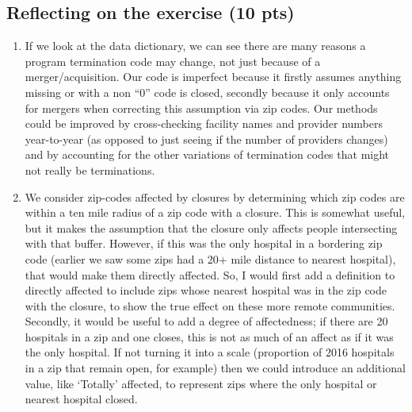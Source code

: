 \documentclass[
  letterpaper,
  DIV=11,
  numbers=noendperiod]{scrartcl}
\begin{document}
\subsection{Reflecting on the exercise (10
pts)}\label{reflecting-on-the-exercise-10-pts}

\begin{enumerate}
\def\labelenumi{\arabic{enumi}.}
\item
  If we look at the data dictionary, we can see there are many reasons a
  program termination code may change, not just because of a
  merger/acquisition. Our code is imperfect because it firstly assumes
  anything missing or with a non ``0'' code is closed, secondly because
  it only accounts for mergers when correcting this assumption via zip
  codes. Our methods could be improved by cross-checking facility names
  and provider numbers year-to-year (as opposed to just seeing if the
  number of providers changes) and by accounting for the other
  variations of termination codes that might not really be terminations.
\item
  We consider zip-codes affected by closures by determining which zip
  codes are within a ten mile radius of a zip code with a closure. This
  is somewhat useful, but it makes the assumption that the closure only
  affects people intersecting with that buffer. However, if this was the
  only hospital in a bordering zip code (earlier we saw some zips had a
  20+ mile distance to nearest hospital), that would make them directly
  affected. So, I would first add a definition to directly affected to
  include zips whose nearest hospital was in the zip code with the
  closure, to show the true effect on these more remote communities.
  Secondly, it would be useful to add a degree of affectedness; if there
  are 20 hospitals in a zip and one closes, this is not as much of an
  affect as if it was the only hospital. If not turning it into a scale
  (proportion of 2016 hospitals in a zip that remain open, for example)
  then we could introduce an additional value, like `Totally' affected,
  to represent zips where the only hospital or nearest hospital closed.
\end{enumerate}
\end{document}
